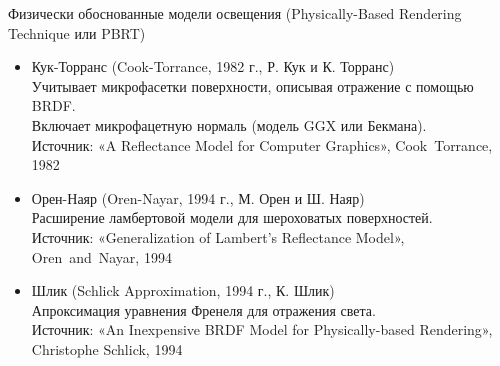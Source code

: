 \documentclass{beamer}
\begin{document}
	
	\begin{frame}{Физически обоснованные модели освещения (Physically-Based Rendering Technique или PBRT)}


		\begin{itemize}
			\item 
			Кук-Торранс (Cook-Torrance, 1982 г., Р. Кук и К. Торранс)\\
			Учитывает микрофасетки поверхности, описывая отражение с помощью BRDF.\\
			Включает микрофацетную нормаль (модель GGX или Бекмана).\\
			Источник: «A Reflectance Model for Computer Graphics», Cook~Torrance, 1982
	
			\item
			Орен-Наяр (Oren-Nayar, 1994 г., М. Орен и Ш. Наяр)\\
			Расширение ламбертовой модели для шероховатых поверхностей.\\
			Источник: «Generalization of Lambert's Reflectance Model», Oren~and~Nayar, 1994
	
			\item 
			Шлик (Schlick Approximation, 1994 г., К. Шлик)\\
			Апроксимация уравнения Френеля для отражения света.\\
			Источник: «An Inexpensive BRDF Model for Physically-based Rendering», Christophe Schlick, 1994
		
		\end{itemize}


	\end{frame}
\end{document}
